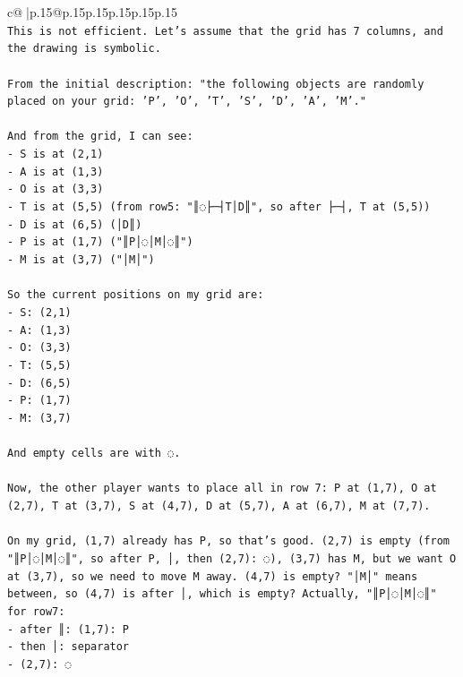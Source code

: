 \documentclass{article}
\begin{document}
{\begin{supertabular}{c@{$\;$}|p{.15\linewidth}@{}p{.15\linewidth}p{.15\linewidth}p{.15\linewidth}p{.15\linewidth}p{.15\linewidth}}
{{{\\ 
\texttt{This is not efficient. Let's assume that the grid has 7 columns, and the drawing is symbolic.} \\
\\ 
\texttt{From the initial description: "the following objects are randomly placed on your grid: 'P', 'O', 'T', 'S', 'D', 'A', 'M'."} \\
\\ 
\texttt{And from the grid, I can see:} \\
\texttt{{-} S is at (2,1)} \\
\texttt{{-} A is at (1,3)} \\
\texttt{{-} O is at (3,3)} \\
\texttt{{-} T is at (5,5) (from row5: "║◌├─┤T│D║", so after ├─┤, T at (5,5))} \\
\texttt{{-} D is at (6,5) (│D║)} \\
\texttt{{-} P is at (1,7) ("║P│◌│M│◌║")} \\
\texttt{{-} M is at (3,7) ("│M│")} \\
\\ 
\texttt{So the current positions on my grid are:} \\
\texttt{{-} S: (2,1)} \\
\texttt{{-} A: (1,3)} \\
\texttt{{-} O: (3,3)} \\
\texttt{{-} T: (5,5)} \\
\texttt{{-} D: (6,5)} \\
\texttt{{-} P: (1,7)} \\
\texttt{{-} M: (3,7)} \\
\\ 
\texttt{And empty cells are with ◌.} \\
\\ 
\texttt{Now, the other player wants to place all in row 7: P at (1,7), O at (2,7), T at (3,7), S at (4,7), D at (5,7), A at (6,7), M at (7,7).} \\
\\ 
\texttt{On my grid, (1,7) already has P, so that's good. (2,7) is empty (from "║P│◌│M│◌║", so after P, │, then (2,7): ◌), (3,7) has M, but we want O at (3,7), so we need to move M away. (4,7) is empty? "│M│" means between, so (4,7) is after │, which is empty? Actually, "║P│◌│M│◌║" for row7: } \\
\texttt{{-} after ║: (1,7): P} \\
\texttt{{-} then │: separator} \\
\texttt{{-} (2,7): ◌} \\
}}}
\end{supertabular}}
\end{document}
